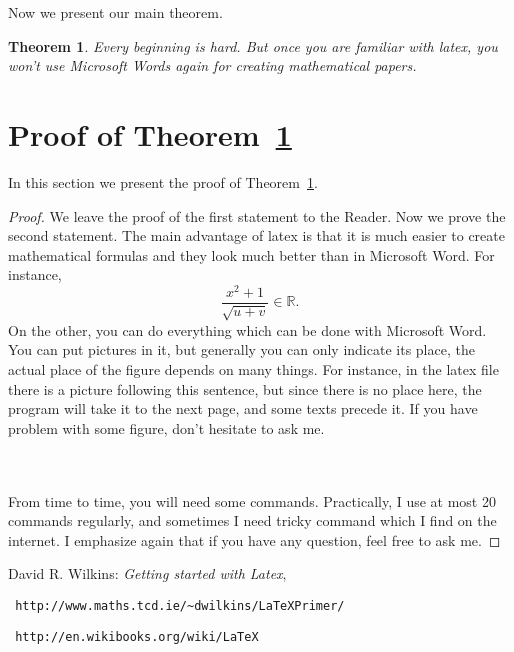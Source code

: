 \documentclass[12pt,a4paper]{amsart}
\numberwithin{equation}{section}
\theoremstyle{plain}
\newtheorem{Th}{Theorem}[section]
\theoremstyle{definition}
\begin{document}
Now we present our main theorem.

\begin{Th} \label{main} Every beginning is hard. But once you are familiar with latex, you won't use Microsoft Words again for creating mathematical papers.
\end{Th}

\section{Proof of Theorem~\ref{main}}

In this section we present the proof of Theorem~\ref{main}.

\begin{proof} We leave the proof of the first statement to the Reader. Now we prove the second statement. The main advantage of latex is that it is much easier to create mathematical formulas and they look much better than in Microsoft Word.
For instance,
$$\frac{x^2+1}{\sqrt{u+v}}\in \mathbb{R}.$$
On the other, you can do everything which can be done with Microsoft Word. You can put pictures in it, but generally you can only indicate its place, the actual place of the figure depends on many things. For instance, in the latex file there is a picture following this sentence, but since there is no place here, the program will take it to the next page, and some texts precede it. If you have problem with some figure, don't hesitate to ask me.

\\\\
From time to time, you will need some commands. Practically, I use at most 20 commands regularly, and sometimes I need tricky command which I find on the internet. I emphasize again that if you have any question, feel free to ask me.

\end{proof}

\begin{thebibliography}{99} 

 David R. Wilkins: \textit{Getting started with Latex}, \begin{verbatim} http://www.maths.tcd.ie/~dwilkins/LaTeXPrimer/
\end{verbatim}

 \begin{verbatim} http://en.wikibooks.org/wiki/LaTeX \end{verbatim}



\end{thebibliography}
\end{document}
